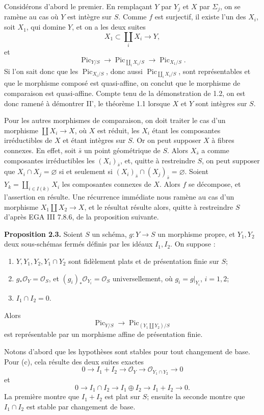 \documentclass[11pt]{article}
\providecommand{\Pic}{\operatorname{Pic}}
\begin{document}
Considérons d'abord le premier. En remplaçant \(Y\) par \(Y_j\) et \(X\) par \(\Sigma_j\), on se ramène au cas où \(Y\) est intègre sur \(S\). Comme \(f\) est surjectif, il existe l'un des \(X_i\), soit \(X_1\), qui domine \(Y\), et on a les deux suites
\[
  X_1\subset \coprod_i X_i\longrightarrow Y,
\]
et
\[
  \Pic_{Y/S}\longrightarrow \Pic_{\coprod_iX_i/S}\longrightarrow \Pic_{X_1/S}.
\]
Si l'on sait donc que les \(\Pic_{X_i/S}\), donc aussi \(\Pic_{\coprod_iX_i/S}\), sont représentables et que le morphisme composé est quasi-affine, on conclut que le morphisme de comparaison est quasi-affine. Compte tenu de la démonstration de 1.2, on est donc ramené à démontrer II', le théorème 1.1 lorsque \(X\) et \(Y\) sont intègres sur \(S\).

Pour les autres morphismes de comparaison, on doit traiter le cas d'un morphisme \(\coprod X_i\to X\), où \(X\) est réduit, les \(X_i\) étant les composantes irréductibles de \(X\) et étant intègres sur \(S\). Or on peut supposer \(X\) à fibres connexes. En effet, soit \(\bar s\) un point géométrique de \(S\). Alors \(X_{\bar s}\) a comme composantes irréductibles les \((X_i)_{\bar s}\), et, quitte à restreindre \(S\), on peut supposer que \(X_i\cap X_j=\varnothing\) si et seulement si \((X_i)_{\bar s}\cap(X_j)_{\bar s}=\varnothing\). Soient \(Y_k=\coprod_{i\in I(k)}X_i\) les composantes connexes de \(X\). Alors \(f\) se décompose, et l'assertion en résulte. Une récurrence immédiate nous ramène au cas d'un morphisme \(X_1\amalg X_2\to X\), et le résultat résulte alors, quitte à restreindre \(S\) d'après EGA III 7.8.6, de la proposition suivante.

\textbf{Proposition 2.3.} Soient \(S\) un schéma, \(g:Y\to S\) un morphisme propre, et \(Y_1,Y_2\) deux sous-schémas fermés définis par les idéaux \(I_1,I_2\). On suppose :
\begin{enumerate}[label=\alph*)]
\item \(Y,Y_1,Y_2,Y_1\cap Y_2\) sont fidèlement plats et de présentation finie sur \(S\);
\item \(g_*\mathcal O_Y=\mathcal O_S\), et \((g_i)_*\mathcal O_{Y_i}=\mathcal O_S\) universellement, où \(g_i=g|_{Y_i}\), \(i=1,2\);
\item \(I_1\cap I_2=0\).
\end{enumerate}
Alors
\[
  \Pic_{Y/S}\longrightarrow \Pic_{(Y_1\amalg Y_2)/S}
\]
est représentable par un morphisme affine de présentation finie.

Notons d'abord que les hypothèses sont stables pour tout changement de base. Pour (c), cela résulte des deux suites exactes
\[
  0\longrightarrow I_1+I_2\longrightarrow\mathcal O_Y
  \longrightarrow\mathcal O_{Y_1\cap Y_2}\longrightarrow0
\]
et
\[
  0\longrightarrow I_1\cap I_2\longrightarrow I_1\oplus I_2
  \longrightarrow I_1+I_2\longrightarrow0.
\]
La première montre que \(I_1+I_2\) est plat sur \(S\); ensuite la seconde montre que \(I_1\cap I_2\) est stable par changement de base.
\end{document}
